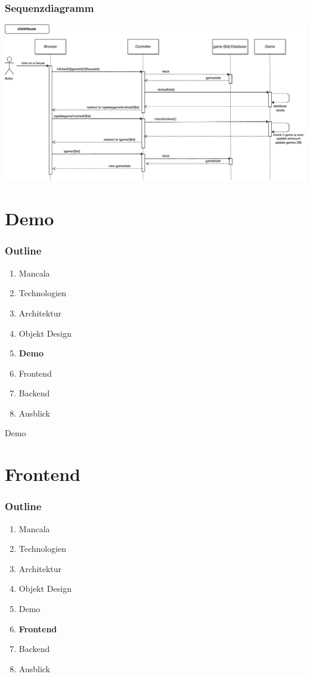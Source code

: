 \documentclass[
	10pt,
	t		%
]{beamer}
\begin{document}
\begin{frame}
\frametitle{Sequenzdiagramm}
\begin{center}
\includegraphics[scale=0.32]{./../Diagrams/Sequence_clickHouse.pdf}
\end{center}
\end{frame}

\section{Demo}
\begin{frame}
\frametitle{Outline}
\begin{enumerate}
\item Mancala
\item Technologien
\item Architektur
\item Objekt Design
\item \textbf{Demo}
\item Frontend
\item Backend
\item Ausblick
\end{enumerate}
\end{frame}

\begin{frame}[plain, c]
\begin{center}
\Large Demo
\end{center}
\end{frame}

\section{Frontend}
\begin{frame}
\frametitle{Outline}
\begin{enumerate}
\item Mancala
\item Technologien
\item Architektur
\item Objekt Design
\item Demo
\item \textbf{Frontend}
\item Backend
\item Ausblick
\end{enumerate}
\end{frame}
\end{document}
